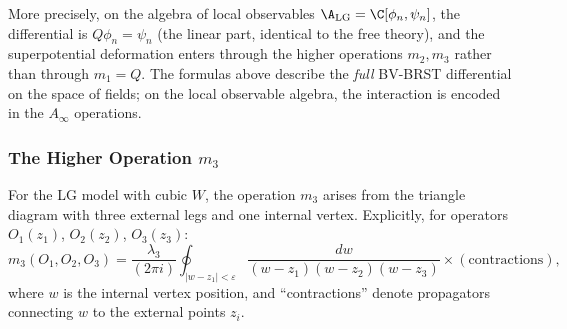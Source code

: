 \begin{remark}
More precisely, on the algebra of local observables $\A_{\text{LG}} = \C[\phi_n, \psi_n]$, the differential is $Q\phi_n = \psi_n$ (the linear part, identical to the free theory), and the superpotential deformation enters through the higher operations $m_2, m_3$ rather than through $m_1 = Q$. The formulas above describe the \emph{full} BV-BRST differential on the space of fields; on the local observable algebra, the interaction is encoded in the $A_\infty$ operations.
\end{remark}

\subsubsection{The Higher Operation $m_3$}

\begin{proposition}
\label{prop:LG_m3}
For the LG model with cubic $W$, the operation $m_3$ arises from the triangle diagram with three external legs and one internal vertex. Explicitly, for operators $O_1(z_1)$, $O_2(z_2)$, $O_3(z_3)$:
\begin{equation}
\label{eq:LG_m3_formula}
m_3(O_1, O_2, O_3) = \frac{\lambda_3}{(2\pi i)} \oint_{|w-z_1| < \varepsilon} \frac{dw}{(w-z_1)(w-z_2)(w-z_3)} \times (\text{contractions}),
\end{equation}
where $w$ is the internal vertex position, and ``contractions'' denote propagators connecting $w$ to the external points $z_i$.
\end{proposition}


